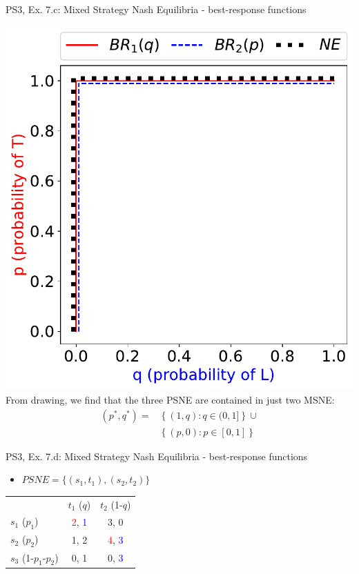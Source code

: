 \begin{frame}{PS3, Ex. 7.c: Mixed Strategy Nash Equilibria - best-response functions}
\begin{multicols}{2}
    \includegraphics[width=\columnwidth]{figures/5c2}
    From drawing, we find that the three PSNE are contained in just two MSNE:
    \begin{align*}
      (p^{*},q^{*})=&\left\{(1,q):q\in(0,1]\right\}\cup\\
                    &\left\{(p,0):p\in[0,1]\right\}
    \end{align*}
  \vfill\null
  \end{multicols}
\end{frame}
\begin{frame}{PS3, Ex. 7.d: Mixed Strategy Nash Equilibria - best-response functions}
  \begin{multicols}{2}
    \begin{itemize}
      \item[(d)] $PSNE=\{(s_1,t_1),(s_2,t_2)\}$
    \end{itemize}
    \begin{table}
      \begin{tabular}{l|c|c|}
          \multicolumn{1}{c}{}  & \multicolumn{1}{c}{$t_1$ ($q$)} & \multicolumn{1}{c}{$t_2$ (1-$q$)} \\\cline{2-3}
          $s_1$ ($p_1$)         & \textcolor{red}{2}, \textcolor{blue}{1} & 3, 0 \\\cline{2-3}
          $s_2$ ($p_2$)         & 1, 2 & \textcolor{red}{4}, \textcolor{blue}{3} \\\cline{2-3}
          $s_3$ (1-$p_1$-$p_2$) & 0, 1 & 0, \textcolor{blue}{3} \\\cline{2-3}
      \end{tabular}
    \end{table}
  \vfill\null \columnbreak
  \vfill\null
  \end{multicols}
\end{frame}

